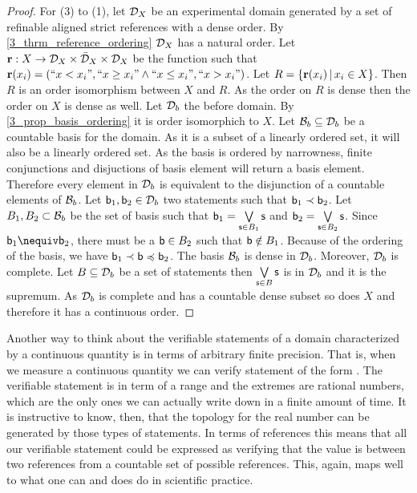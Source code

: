 \documentclass[11pt,letterpaper,fleqn]{memoir} %
\begin{document}
\begin{mathSection}
\begin{proof}
	For (3) to (1), let $\edomain_X$ be an experimental domain generated by a set of refinable aligned strict references with a dense order. By \ref{3_thrm_reference_ordering} $\edomain_X$ has a natural order. Let $\refStmt : X \to \edomain_X \times \tdomain_X \times \edomain_X$ be the function such that $\refStmt(x_i) = (``x < x_i", ``x \geq x_i" \AND ``x \leq x_i", ``x > x_i")$. Let $R=\{ \refStmt(x_i) \, | \, x_i \in X \}$. Then $R$ is an order isomorphism between $X$ and $R$. As the order on $R$ is dense then the order on $X$ is dense as well. Let $\edomain_b$ the before domain. By \ref{3_prop_basis_ordering} it is order isomorphich to $X$. Let $\basis_b \subseteq \edomain_b$ be a countable basis for the domain. As it is a subset of a linearly ordered set, it will also be a linearly ordered set. As the basis is ordered by narrowness, finite conjunctions and disjuctions of basis element will return a basis element. Therefore every element in $\edomain_b$ is equivalent to the disjunction of a countable elements of $\basis_b$. Let $\stmt[b]_1, \stmt[b]_2 \in \edomain_b$ two statements such that $\stmt[b]_1 \snarrower \stmt[b]_2$. Let $B_1, B_2 \subset \basis_b$ be the set of basis such that $\stmt[b]_1 = \bigOR\limits_{\stmt \in B_1} \stmt$ and $\stmt[b]_2 = \bigOR\limits_{\stmt \in B_2} \stmt$. Since $\stmt[b]_1 \nequiv \stmt[b]_2$, there must be a $\stmt[b] \in B_2$ such that $\stmt[b] \notin B_1$. Because of the ordering of the basis, we have $\stmt[b]_1 \snarrower \stmt[b] \narrower \stmt[b]_2$. The basis $\basis_b$ is dense in $\edomain_b$. Moreover, $\edomain_b$ is complete. Let $B \subseteq \edomain_b$ be a set of statements then $\bigOR\limits_{\stmt \in B} \stmt$ is in $\edomain_b$ and it is the supremum. As $\edomain_b$ is complete and has a countable dense subset so does $X$ and therefore it has a continuous order.
\end{proof}
\end{mathSection}

Another way to think about the verifiable statements of a domain characterized by a continuous quantity is in terms of arbitrary finite precision. That is, when we measure a continuous quantity we can verify statement of the form . The verifiable statement is in term of a range and the extremes are rational numbers, which are the only ones we can actually write down in a finite amount of time. It is instructive to know, then, that the topology for the real number can be generated by those types of statements. In terms of references this means that all our verifiable statement could be expressed as verifying that the value is between two references from a countable set of possible references. This, again, maps well to what one can and does do in scientific practice.
\end{document}
